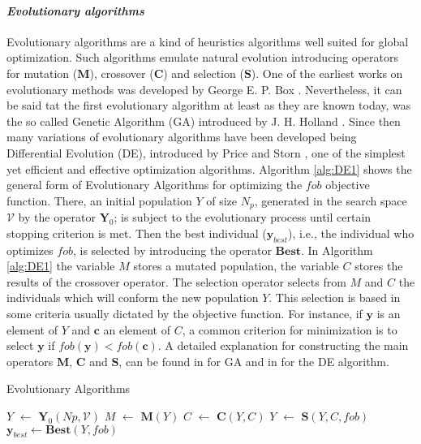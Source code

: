\paragraph{\it Evolutionary algorithms}
Evolutionary algorithms are a kind of heuristics algorithms well 
suited for global optimization. Such algorithms emulate natural
evolution introducing operators for mutation ($\mathbf{M}$), crossover 
($\mathbf{C}$) and selection ($\mathbf{S}$). One of the earliest works
on evolutionary methods was developed by George E. P. Box \cite{Box1957}.
Nevertheless, it can be said tat the first evolutionary algorithm at
least as they are known today, was the so called Genetic Algorithm (GA) 
introduced by J. H. Holland \cite{JHH1975}. Since then many variations of
evolutionary algorithms have been developed being Differential Evolution (DE),
introduced by Price and Storn \cite{Storn1997}, one of the simplest yet efficient and 
effective optimization algorithms. Algorithm \ref{alg:DE1} shows the 
general form of Evolutionary Algorithms for optimizing the $fob$ 
objective function. There, an initial population $Y$ of size $N_p$, 
generated in the search space $\mathcal{V}$ by the operator $\mathbf{Y}_0$;
is subject to the evolutionary process until certain stopping criterion is 
met. Then the best individual ($\mathbf{y}_{best}$), i.e., the individual who
optimizes $fob$, is selected by introducing the operator $\mathbf{Best}$. 
In Algorithm \ref{alg:DE1} the variable $M$ stores a mutated population, 
the variable $C$ stores the results of the crossover operator. The selection
operator selects from $M$ and $C$ the individuals which will conform the new
population $Y$. This selection is based in some criteria usually dictated by the
objective function. For instance, if $\mathbf{y}$ is an element of $Y$
and $\mathbf{c}$ an element of $C$, a common criterion for minimization is 
to select $\mathbf{y}$ if $fob(\mathbf{y})<fob(\mathbf{c})$.
A detailed explanation for constructing the main operators 
$\mathbf{M}$, $\mathbf{C}$ and $\mathbf{S}$, can be found in
\cite{Bagchi1999} for GA and in \cite{Price_Storn2005} for the DE
algorithm.
%
\begin{algorithm}[H]
\caption{Evolutionary Algorithms}
\label{alg:DE1}
\begin{algorithmic}
\State $Y$ $\leftarrow$ $\mathbf{Y}_0(Np,\mathcal{V})$
\State $M$ $\leftarrow$  $\mathbf{M}(Y)$
\State $C$ $\leftarrow$  $\mathbf{C}(Y,C)$
\State $Y$ $\leftarrow$  $\mathbf{S}(Y,C,fob)$ 
\EndWhile
\State $\mathbf{y}_{best} \leftarrow \mathbf{Best}(Y, fob)$
\end{algorithmic}
\end{algorithm}%


